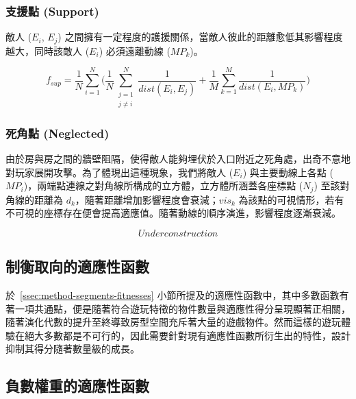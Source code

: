 \subsubsection{支援點 (Support)}
\label{sssec:method-segments-fitnesses-support}

敵人 ($E_{i}$, $E_{j}$) 之間擁有一定程度的護援關係，當敵人彼此的距離愈低其影響程度越大，同時該敵人 ($E_{i}$) 必須遠離動線 ($MP_{k}$)。

\begin{equation}
f_{sup}=\frac{1}{N} \sum_{i=1}^{N} \bigg( \frac{1}{N} \sum_{\substack{j=1 \\ j \neq i}}^{N} \frac{1}{dist(E_{i}, E_{j})} + \frac{1}{M} \sum_{k=1}^{M} \frac{1}{dist(E_{i}, MP_{k})} \bigg)
\end{equation}

\subsubsection{死角點 (Neglected)}
\label{sssec:method-segments-fitnesses-neglected}

由於房與房之間的牆壁阻隔，使得敵人能夠埋伏於入口附近之死角處，出奇不意地對玩家展開攻擊。為了體現出這種現象，我們將敵人 ($E_{i}$) 與主要動線上各點 ($MP_{i}$)，兩端點連線之對角線所構成的立方體，立方體所涵蓋各座標點 ($N_{j}$) 至該對角線的距離為 $d_{k}$，隨著距離增加影響程度會衰減；$vis_{k}$ 為該點的可視情形，若有不可視的座標存在便會提高適應值。隨著動線的順序演進，影響程度逐漸衰減。

\begin{equation}
Under construction
\end{equation}

\subsection{制衡取向的適應性函數}
\label{ssec:method-segments-balancefitness}

於~\ref{ssec:method-segments-fitnesses} 小節所提及的適應性函數中，其中多數函數有著一項共通點，便是隨著符合遊玩特徵的物件數量與適應性得分呈現顯著正相關，隨著演化代數的提升至終導致房型空間充斥著大量的遊戲物件。然而這樣的遊玩體驗在絕大多數都是不可行的，因此需要針對現有適應性函數所衍生出的特性，設計抑制其得分隨著數量級的成長。

\subsection{負數權重的適應性函數}
\label{ssec:method-segments-minusscores}

